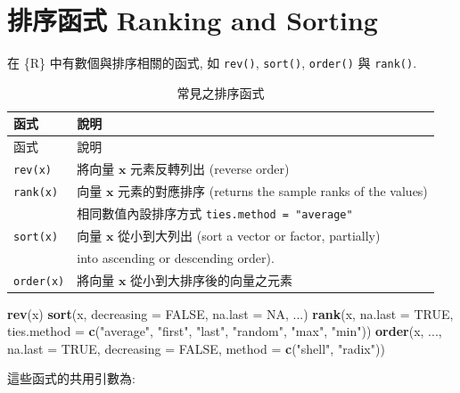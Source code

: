 \documentclass[
]{book}
\newenvironment{Shaded}{\begin{snugshade}}{\end{snugshade}}
\newcommand{\DataTypeTok}[1]{\textcolor[rgb]{0.13,0.29,0.53}{#1}}
\newcommand{\KeywordTok}[1]{\textcolor[rgb]{0.13,0.29,0.53}{\textbf{#1}}}
\newcommand{\NormalTok}[1]{#1}
\newcommand{\OtherTok}[1]{\textcolor[rgb]{0.56,0.35,0.01}{#1}}
\newcommand{\StringTok}[1]{\textcolor[rgb]{0.31,0.60,0.02}{#1}}
\begin{document}
\hypertarget{ux6392ux5e8fux51fdux5f0f-ranking-and-sorting}{%
\section{排序函式 Ranking and Sorting}\label{ux6392ux5e8fux51fdux5f0f-ranking-and-sorting}}

在 \{R\} 中有數個與排序相關的函式,
如
\texttt{rev()},
\texttt{sort()},
\texttt{order()}
與
\texttt{rank()}.

\begin{longtable}[]{@{}ll@{}}
\caption{常見之排序函式}\tabularnewline
\toprule
函式 & 說明\tabularnewline
\midrule
\endfirsthead
\toprule
函式 & 說明\tabularnewline
\midrule
\endhead
\texttt{rev(x)} & 將向量 \(\mathbf{x}\) 元素反轉列出 (reverse order)\tabularnewline
\texttt{rank(x)} & 向量 \(\mathbf{x}\) 元素的對應排序 (returns the sample ranks of the values)\tabularnewline
& 相同數值內設排序方式 \texttt{ties.method\ =\ "average"}\tabularnewline
\texttt{sort(x)} & 向量 \(\mathbf{x}\) 從小到大列出 (sort a vector or factor, partially)\tabularnewline
& into ascending or descending order).\tabularnewline
\texttt{order(x)} & 將向量 \(\mathbf{x}\) 從小到大排序後的向量之元素\tabularnewline
\bottomrule
\end{longtable}

\begin{Shaded}
\begin{Highlighting}[]
\KeywordTok{rev}\NormalTok{(x)}
\KeywordTok{sort}\NormalTok{(x, }\DataTypeTok{decreasing =} \OtherTok{FALSE}\NormalTok{, }\DataTypeTok{na.last =} \OtherTok{NA}\NormalTok{, ...)}
\KeywordTok{rank}\NormalTok{(x, }\DataTypeTok{na.last =} \OtherTok{TRUE}\NormalTok{,}
     \DataTypeTok{ties.method =} \KeywordTok{c}\NormalTok{(}\StringTok{"average"}\NormalTok{, }\StringTok{"first"}\NormalTok{, }\StringTok{"last"}\NormalTok{, }\StringTok{"random"}\NormalTok{, }\StringTok{"max"}\NormalTok{, }\StringTok{"min"}\NormalTok{))}
\KeywordTok{order}\NormalTok{(x, ..., }\DataTypeTok{na.last =} \OtherTok{TRUE}\NormalTok{, }\DataTypeTok{decreasing =} \OtherTok{FALSE}\NormalTok{,}
        \DataTypeTok{method =} \KeywordTok{c}\NormalTok{(}\StringTok{"shell"}\NormalTok{, }\StringTok{"radix"}\NormalTok{))}
\end{Highlighting}
\end{Shaded}

這些函式的共用引數為:
\end{document}
